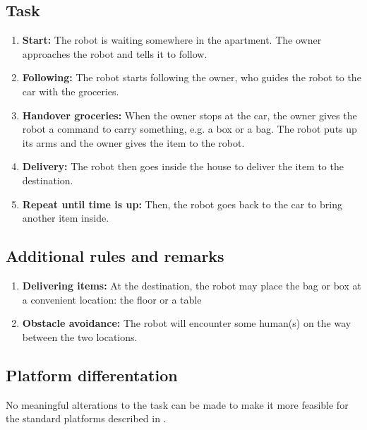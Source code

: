 \subsection{Task}
\begin{enumerate}
\item \textbf{Start:} The robot is waiting somewhere in the apartment. The owner approaches the robot and tells it to follow.
\item \textbf{Following:} The robot starts following the owner, who guides the robot to the car with the groceries. 
\item \textbf{Handover groceries:} When the owner stops at the car, the owner gives the robot a command to carry something, e.g. a box or a bag.  The robot puts up its arms and the owner gives the item to the robot.
\item \textbf{Delivery:} The robot then goes inside the house to deliver the item to the destination. 
\item \textbf{Repeat until time is up:} Then, the robot goes back to the car to bring another item inside. 
\end{enumerate}

\subsection{Additional rules and remarks}
\begin{enumerate}
  \item \textbf{Delivering items:} At the destination, the robot may place the bag or box at a convenient location: the floor or a table
  \item \textbf{Obstacle avoidance:} The robot will encounter some human(s) on the way between the two locations.  
\end{enumerate}

\subsection{Platform differentation}
No meaningful alterations to the task can be made to make it more feasible for the standard platforms described in . 

